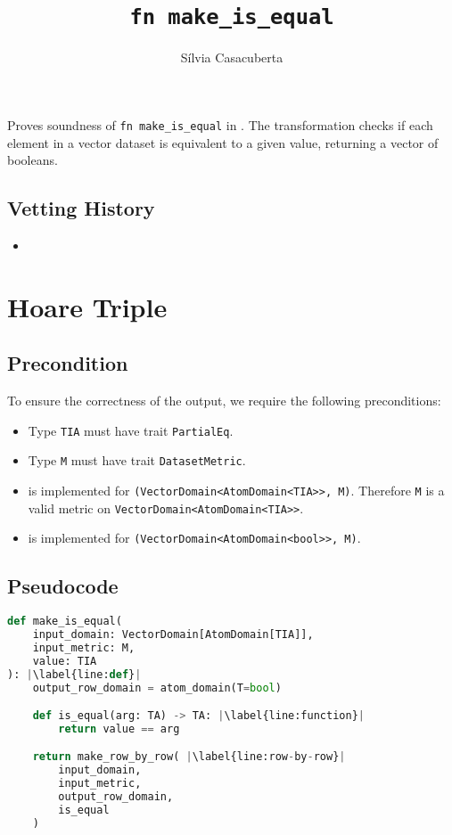 \documentclass{article}
\title{\texttt{fn make\_is\_equal}}
\author{S\'ilvia Casacuberta}
\date{}
\begin{document}
\maketitle

\contrib
Proves soundness of \texttt{fn make\_is\_equal} in .
The transformation checks if each element in a vector dataset is equivalent to a given value,
returning a vector of booleans.

\subsection*{Vetting History}
\begin{itemize}
    \item {}
\end{itemize}

\section{Hoare Triple}
\subsection*{Precondition}
To ensure the correctness of the output, we require the following preconditions:

\begin{itemize}
    \item Type \texttt{TIA} must have trait \texttt{PartialEq}.
    \item Type \texttt{M} must have trait \texttt{DatasetMetric}.
    \item {} is implemented for \texttt{(VectorDomain<AtomDomain<TIA>>, M)}. Therefore \texttt{M} is a valid metric on \texttt{VectorDomain<AtomDomain<TIA>>}.
    \item {} is implemented for \texttt{(VectorDomain<AtomDomain<bool>>, M)}.
\end{itemize}

\subsection*{Pseudocode}
\begin{lstlisting}[language=Python, escapechar=|] 
def make_is_equal(
    input_domain: VectorDomain[AtomDomain[TIA]], 
    input_metric: M, 
    value: TIA
): |\label{line:def}|
    output_row_domain = atom_domain(T=bool)

    def is_equal(arg: TA) -> TA: |\label{line:function}|
        return value == arg

    return make_row_by_row( |\label{line:row-by-row}|
        input_domain, 
        input_metric, 
        output_row_domain, 
        is_equal
    )
\end{lstlisting}
\end{document}
